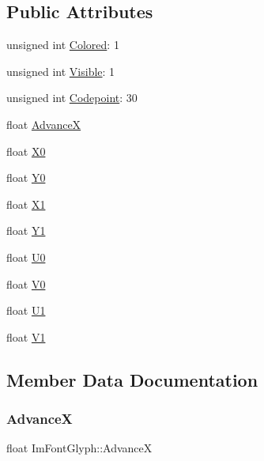 \subsection*{Public Attributes}
\begin{DoxyCompactItemize}
\item 
unsigned int \hyperlink{structImFontGlyph_a6dca72bfeb40ba1cf6ceae007894f665}{Colored}\+: 1
\item 
unsigned int \hyperlink{structImFontGlyph_a4e7d64945eeb9cf823c2ce7bb66a1e85}{Visible}\+: 1
\item 
unsigned int \hyperlink{structImFontGlyph_a2016b685049bf375f7c045ed8e24d6b7}{Codepoint}\+: 30
\item 
float \hyperlink{structImFontGlyph_a11bfab7bcdb497fe2d649745c7d39b33}{AdvanceX}
\item 
float \hyperlink{structImFontGlyph_a1e93bf7292c052549972fc46646ff104}{X0}
\item 
float \hyperlink{structImFontGlyph_ac1deecd5b352949f30d396a58b68dd09}{Y0}
\item 
float \hyperlink{structImFontGlyph_a1d907170d807c5e5f2a43d74b99f0d89}{X1}
\item 
float \hyperlink{structImFontGlyph_aa6a0440694ae06c4cf03316498327bd2}{Y1}
\item 
float \hyperlink{structImFontGlyph_a3c9d90fb39f6beaf9d69413fa4c8366f}{U0}
\item 
float \hyperlink{structImFontGlyph_a26b7b7b9ee43ab67e98af9ea1131ce20}{V0}
\item 
float \hyperlink{structImFontGlyph_aaca9625f2d6972016e05fed583db85b0}{U1}
\item 
float \hyperlink{structImFontGlyph_a3d28904aad639835cdff3e4416663d7c}{V1}
\end{DoxyCompactItemize}


\subsection{Member Data Documentation}
\mbox{\label{structImFontGlyph_a11bfab7bcdb497fe2d649745c7d39b33}} 
\subsubsection{\texorpdfstring{AdvanceX}{AdvanceX}}
{\footnotesize\ttfamily float Im\+Font\+Glyph\+::\+AdvanceX}

